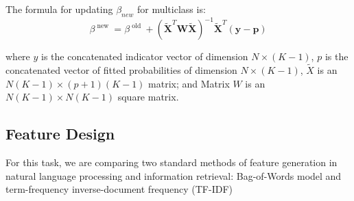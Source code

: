 The formula for updating $\beta_{new}$ for multiclass is:
$$\beta ^ { \text { new } } = \beta ^ { \text { old } } + \left( \tilde { \mathbf { X } } ^ { T } \mathbf { W } \tilde { \mathbf { X } } \right) ^ { - 1 } \tilde { \mathbf { X } } ^ { T } ( \mathbf { y } - \mathbf { p } )$$

where $y$ is the concatenated indicator vector of dimension $N \times (K-1)$, $p$ is the concatenated vector of fitted probabilities of dimension $N \times (K-1)$, $\tilde{X}$ is an $N(K-1)\times (p+1)(K-1)$ matrix; and Matrix $W$ is an $N(K-1)\times N(K-1)$ square matrix. \citep{friedman2001elements}

\subsection{Feature Design}

For this task, we are comparing two standard methods of feature generation in natural language processing and information retrieval: Bag-of-Words model and term-frequency inverse-document frequency (TF-IDF)

%
%





